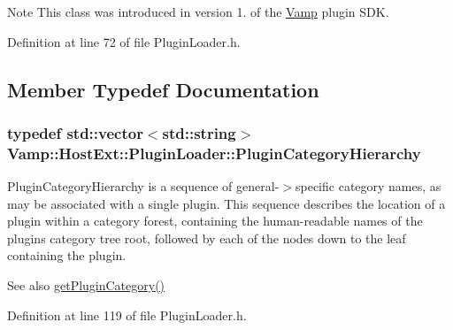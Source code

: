 \begin{DoxyNote}{Note}
This class was introduced in version 1. of the \hyperlink{namespace_vamp}{Vamp} plugin S\+DK. 
\end{DoxyNote}


Definition at line 72 of file Plugin\+Loader.\+h.



\subsection{Member Typedef Documentation}
\subsubsection[{\texorpdfstring{Plugin\+Category\+Hierarchy}{PluginCategoryHierarchy}}]{\setlength{\rightskip}{0pt plus 5cm}typedef std\+::vector$<${\bf std\+::string}$>$ {\bf Vamp\+::\+Host\+Ext\+::\+Plugin\+Loader\+::\+Plugin\+Category\+Hierarchy}}\hypertarget{class_vamp_1_1_host_ext_1_1_plugin_loader_ad6a39aa0c79d8d9209eb0b8dfe9d1364}{}\label{class_vamp_1_1_host_ext_1_1_plugin_loader_ad6a39aa0c79d8d9209eb0b8dfe9d1364}
Plugin\+Category\+Hierarchy is a sequence of general-\/$>$specific category names, as may be associated with a single plugin. This sequence describes the location of a plugin within a category forest, containing the human-\/readable names of the plugin\textquotesingle{}s category tree root, followed by each of the nodes down to the leaf containing the plugin.

\begin{DoxySeeAlso}{See also}
\hyperlink{class_vamp_1_1_host_ext_1_1_plugin_loader_ad5c594142ff058bd70e66247d45cd86e}{get\+Plugin\+Category()} 
\end{DoxySeeAlso}


Definition at line 119 of file Plugin\+Loader.\+h.


